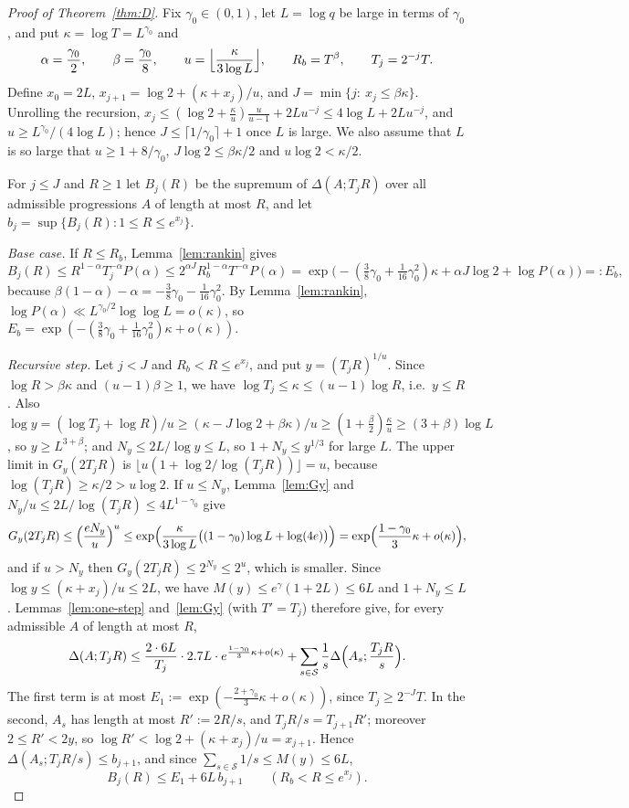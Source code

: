 \begin{proof}[Proof of Theorem~\ref{thm:D}]
Fix $\gamma_0\in(0,1)$, let $L=\log q$ be large in terms of $\gamma_0$, and put $\kappa=\log T=L^{\gamma_0}$ and
\[
\alpha=\frac{\gamma_0}2,\qquad\beta=\frac{\gamma_0}8,\qquad u=\Bigl\lfloor\frac\kappa{3\log L}\Bigr\rfloor,\qquad
R_b=T^\beta,\qquad T_j=2^{-j}T.
\]
Define $x_0=2L$, $x_{j+1}=\log2+(\kappa+x_j)/u$, and $J=\min\{j:\ x_j\le\beta\kappa\}$. Unrolling the recursion,
$x_j\le(\log2+\frac\kappa u)\frac u{u-1}+2Lu^{-j}\le4\log L+2Lu^{-j}$, and $u\ge L^{\gamma_0}/(4\log L)$; hence
$J\le\lceil1/\gamma_0\rceil+1$ once $L$ is large. We also assume that $L$ is so large that $u\ge1+8/\gamma_0$,
$J\log2\le\beta\kappa/2$ and $u\log2<\kappa/2$.

For $j\le J$ and $R\ge1$ let $B_j(R)$ be the supremum of $\Delta(A;T_jR)$ over all admissible progressions $A$ of
length at most $R$, and let $b_j=\sup\{B_j(R):1\le R\le e^{x_j}\}$.

\emph{Base case.} If $R\le R_b$, Lemma~\ref{lem:rankin} gives
\[
B_j(R)\le R^{1-\alpha}T_j^{-\alpha}P(\alpha)\le2^{\alpha J}R_b^{1-\alpha}T^{-\alpha}P(\alpha)
=\exp\bigl(-(\tfrac38\gamma_0+\tfrac1{16}\gamma_0^2)\kappa+\alpha J\log2+\log P(\alpha)\bigr)=:E_b,
\]
because $\beta(1-\alpha)-\alpha=-\frac38\gamma_0-\frac1{16}\gamma_0^2$. By Lemma~\ref{lem:rankin},
$\log P(\alpha)\ll L^{\gamma_0/2}\log\log L=o(\kappa)$, so
$E_b=\exp(-(\frac38\gamma_0+\frac1{16}\gamma_0^2)\kappa+o(\kappa))$.

\emph{Recursive step.} Let $j<J$ and $R_b<R\le e^{x_j}$, and put $y=(T_jR)^{1/u}$. Since $\log R>\beta\kappa$ and
$(u-1)\beta\ge1$, we have $\log T_j\le\kappa\le(u-1)\log R$, i.e.\ $y\le R$. Also
$\log y=(\log T_j+\log R)/u\ge(\kappa-J\log2+\beta\kappa)/u\ge(1+\frac\beta2)\frac\kappa u\ge(3+\beta)\log L$, so
$y\ge L^{3+\beta}$; and $N_y\le2L/\log y\le L$, so $1+N_y\le y^{1/3}$ for large $L$. The upper limit in $G_y(2T_jR)$
is $\lfloor u(1+\log2/\log(T_jR))\rfloor=u$, because $\log(T_jR)\ge\kappa/2>u\log2$. If $u\le N_y$,
Lemma~\ref{lem:Gy} and $N_y/u\le2L/\log(T_jR)\le4L^{1-\gamma_0}$ give
\[
G_y(2T_jR)\le\Bigl(\frac{eN_y}u\Bigr)^u\le\exp\Bigl(\frac\kappa{3\log L}\bigl((1-\gamma_0)\log L+\log(4e)\bigr)\Bigr)
=\exp\Bigl(\frac{1-\gamma_0}3\kappa+o(\kappa)\Bigr),
\]
and if $u>N_y$ then $G_y(2T_jR)\le2^{N_y}\le2^u$, which is smaller. Since $\log y\le(\kappa+x_j)/u\le2L$, we have
$M(y)\le e^\gamma(1+2L)\le6L$ and $1+N_y\le L$. Lemmas~\ref{lem:one-step} and~\ref{lem:Gy} (with $T'=T_j$) therefore
give, for every admissible $A$ of length at most $R$,
\[
\Delta(A;T_jR)\le\frac{2\cdot6L}{T_j}\cdot2.7L\cdot e^{\frac{1-\gamma_0}3\kappa+o(\kappa)}+\sum_{s\in\mathcal{S}}
\frac1s\Delta\Bigl(A_s;\frac{T_jR}s\Bigr).
\]
The first term is at most $E_1:=\exp(-\frac{2+\gamma_0}3\kappa+o(\kappa))$, since $T_j\ge2^{-J}T$. In the second,
$A_s$ has length at most $R':=2R/s$, and $T_jR/s=T_{j+1}R'$; moreover $2\le R'<2y$, so
$\log R'<\log2+(\kappa+x_j)/u=x_{j+1}$. Hence $\Delta(A_s;T_jR/s)\le b_{j+1}$, and since
$\sum_{s\in\mathcal{S}}1/s\le M(y)\le6L$,
\[
B_j(R)\le E_1+6L\,b_{j+1}\qquad(R_b<R\le e^{x_j}).
\]


\end{proof}
